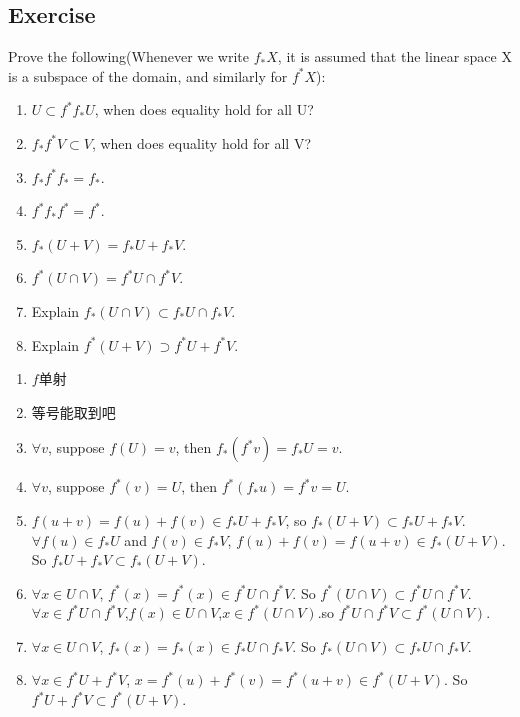 \documentclass[11pt]{ctexart}
\theoremstyle{definition}
\numberwithin{equation}{section}
\theoremstyle{definition}
\theoremstyle{remark}
\begin{document}
\subsection{Exercise}
Prove the following(Whenever we write $f_*X$, it is assumed that the linear space X is a subspace of the domain, and similarly for $f^*X$):
\begin{enumerate}
    \item $U\subset f^*f_*U$, when does equality hold for all U?
    \item $f_*f^*V\subset V$, when does equality hold for all V?
    \item $f_*f^*f_*=f_*$.
    \item $f^*f_*f^*=f^*$.
    \item $f_*(U+V)=f_*U+f_*V$.
    \item $f^*(U\cap V)=f^*U\cap f^*V$.
    \item Explain $f_*(U\cap V)\subset f_*U\cap f_*V$.
    \item Explain $f^*(U+V)\supset f^*U+f^*V$.
\end{enumerate}
\begin{aaa}
    \begin{enumerate}
        \item $f$单射
        \item 等号能取到吧
        \item $\forall v$, suppose $f(U)=v$, then $f_*(f^*v)=f_*U=v$.
        \item $\forall v$, suppose $f^*(v)=U$, then $f^*(f_*u)=f^*v=U$.
        \item $f(u+v)=f(u)+f(v)\in f_*U+f_*V$, so $f_*(U+V)\subset f_*U+f_*V$.\\$\forall f(u)\in f_*U$ and $f(v) \in f_*V$, $f(u)+f(v)=f(u+v) \in f_*(U+V)$. So $f_*U+f_*V\subset f_*(U+V)$.
        \item $\forall x \in U\cap V$, $f^*(x)=f^*(x)\in f^*U\cap f^*V$. So $f^*(U\cap V)\subset f^*U\cap f^*V$.\\$\forall x\in f^*U\cap f^*V$,$f(x)\in U\cap V$,$x\in f^*(U\cap V)$.so $f^*U\cap f^*V\subset f^*(U\cap V)$.
        \item $\forall x\in U\cap V$, $f_*(x)=f_*(x)\in f_*U\cap f_*V$. So $f_*(U\cap V)\subset f_*U\cap f_*V$.
        \item $\forall x\in f^*U+f^*V$, $x=f^*(u)+f^*(v)=f^*(u+v)\in f^*(U+V)$. So $f^*U+f^*V\subset f^*(U+V)$.
    \end{enumerate}
\end{aaa}
\end{document}
